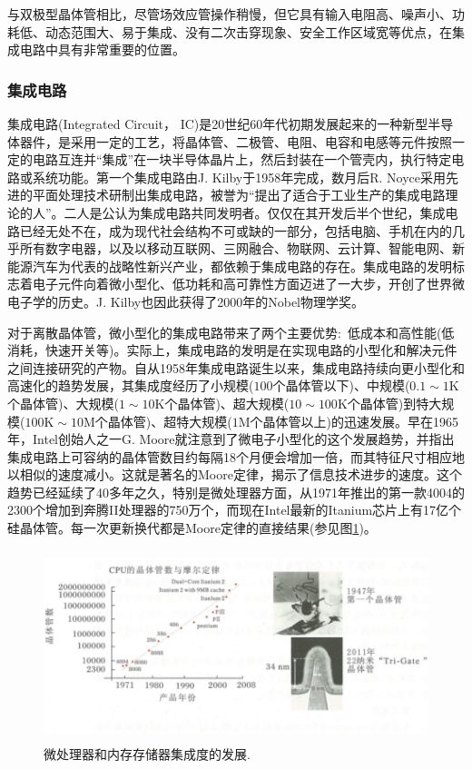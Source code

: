 与双极型晶体管相比，尽管场效应管操作稍慢，但它具有输入电阻高、噪声小、功耗低、动态范围大、易于集成、没有二次击穿现象、安全工作区域宽等优点，在集成电路中具有非常重要的位置。

\subsubsection{集成电路} 
集成电路(Integrated Circuit， IC)是20世纪60年代初期发展起来的一种新型半导体器件，是采用一定的工艺，将晶体管、二极管、电阻、电容和电感等元件按照一定的电路互连并``集成''在一块半导体晶片上，然后封装在一个管壳内，执行特定电路或系统功能。第一个集成电路由J. Kilby于1958年完成，数月后R. Noyce采用先进的平面处理技术研制出集成电路，被誉为``提出了适合于工业生产的集成电路理论的人''。二人是公认为集成电路共同发明者。仅仅在其开发后半个世纪，集成电路已经无处不在，成为现代社会结构不可或缺的一部分，包括电脑、手机在内的几乎所有数字电器，以及以移动互联网、三网融合、物联网、云计算、智能电网、新能源汽车为代表的战略性新兴产业，都依赖于集成电路的存在。集成电路的发明标志着电子元件向着微小型化、低功耗和高可靠性方面迈进了一大步，开创了世界微电子学的历史。J. Kilby也因此获得了2000年的Nobel物理学奖。

对于离散晶体管，微小型化的集成电路带来了两个主要优势:~低成本和高性能(低消耗，快速开关等)。实际上，集成电路的发明是在实现电路的小型化和解决元件之间连接研究的产物。自从1958年集成电路诞生以来，集成电路持续向更小型化和高速化的趋势发展，其集成度经历了小规模($100$个晶体管以下)、中规模($0.1\sim1\mathrm{K}$个晶体管)、大规模($1\sim10\mathrm{K}$个晶体管)、超大规模($10\sim100\mathrm{K}$个晶体管)到特大规模($100\mathrm{K}\sim10\mathrm{M}$个晶体管)、超特大规模($1\mathrm{M}$个晶体管以上)的迅速发展。早在1965年，Intel创始人之一G. Moore就注意到了微电子小型化的这个发展趋势，并指出集成电路上可容纳的晶体管数目约每隔18个月便会增加一倍，而其特征尺寸相应地以相似的速度减小。这就是著名的Moore定律，揭示了信息技术进步的速度。这个趋势已经延续了40多年之久，特别是微处理器方面，从1971年推出的第一款4004的2300个增加到奔腾II处理器的750万个，而现在Intel最新的Itanium芯片上有17亿个硅晶体管。每一次更新换代都是Moore定律的直接结果(参见图\ref{Fig:Moore})。
\begin{figure}[h!]
\centering
\vspace*{-0.10in}
\includegraphics[height=2.20in,width=4.70in,viewport=0 0 110 50,clip]{Figures/Integrated.png}
\caption{\small \textrm{微处理器和内存存储器集成度的发展.}}%
\label{Fig:Moore}
\end{figure} 

